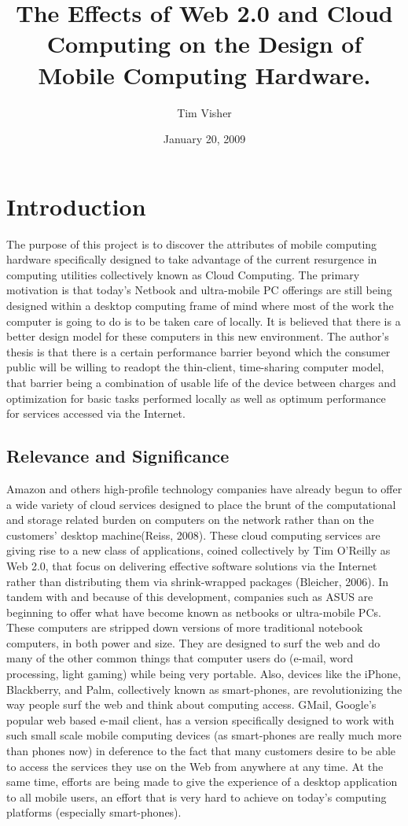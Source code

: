 \documentclass[12pt,oneside,letterpaper]{article}
\author{Tim Visher}
\title{The Effects of Web 2.0 and Cloud Computing on the Design of Mobile Computing Hardware.}
\date{January 20, 2009}
\begin{document}

\tableofcontents
\newpage

\section{Introduction}

The purpose of this project is to discover the attributes of mobile computing
hardware specifically designed to take advantage of the current resurgence in
computing utilities collectively known as Cloud Computing.  The primary
motivation is that today's Netbook and ultra-mobile PC offerings are still being
designed within a desktop computing frame of mind where most of the work the
computer is going to do is to be taken care of locally.  It is believed that
there is a better design model for these computers in this new environment.  The
author's thesis is that there is a certain performance barrier beyond which the
consumer public will be willing to readopt the thin-client, time-sharing
computer model, that barrier being a combination of usable life of the device
between charges and optimization for basic tasks performed locally as well as
optimum performance for services accessed via the Internet.

\subsection{Relevance and Significance}

Amazon and others high-profile technology companies have already begun to offer
a wide variety of cloud services designed to place the brunt of the
computational and storage related burden on computers on the network rather than
on the customers' desktop machine(Reiss, 2008).  These cloud computing services
are giving rise to a new class of applications, coined collectively by Tim
O'Reilly as Web 2.0, that focus on delivering effective software solutions via
the Internet rather than distributing them via shrink-wrapped packages
(Bleicher, 2006).  In tandem with and because of this development, companies
such as ASUS are beginning to offer what have become known as netbooks or
ultra-mobile PCs.  These computers are stripped down versions of more
traditional notebook computers, in both power and size.  They are designed to
surf the web and do many of the other common things that computer users do
(e-mail, word processing, light gaming) while being very portable.  Also,
devices like the iPhone, Blackberry, and Palm, collectively known as
smart-phones, are revolutionizing the way people surf the web and think about
computing access.  GMail, Google's popular web based e-mail client, has a
version specifically designed to work with such small scale mobile computing
devices (as smart-phones are really much more than phones now) in deference to
the fact that many customers desire to be able to access the services they use
on the Web from anywhere at any time.  At the same time, efforts are being made
to give the experience of a desktop application to all mobile users, an effort
that is very hard to achieve on today's computing platforms (especially
smart-phones).
\end{document}
